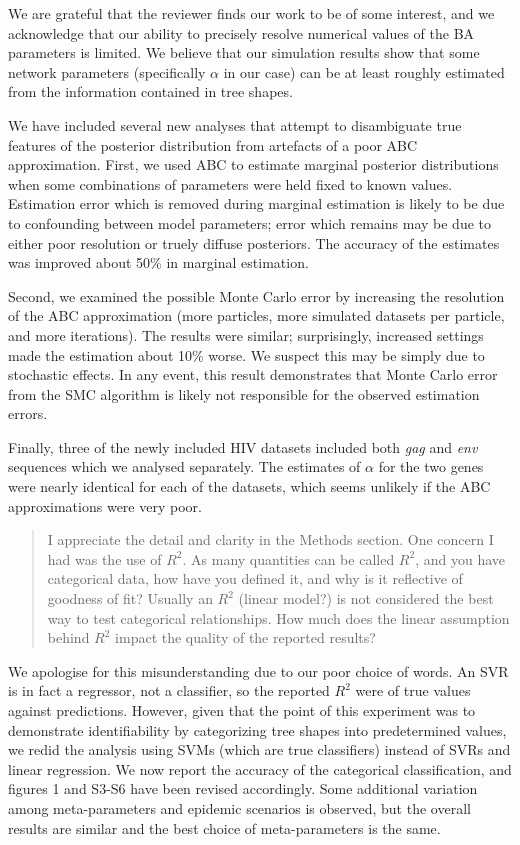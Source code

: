 \documentclass[12pt]{letter}
\begin{document}
\begin{letter}{ }
We are grateful that the reviewer finds our work to be of some interest, and we
acknowledge that our ability to precisely resolve numerical values of the BA
parameters is limited. We believe that our simulation results show that some
network parameters (specifically $\alpha$ in our case) can be at least roughly
estimated from the information contained in tree shapes.

We have included several new analyses that attempt to disambiguate true
features of the posterior distribution from artefacts of a poor ABC
approximation. First, we used ABC to estimate marginal posterior distributions
when some combinations of parameters were held fixed to known values.
Estimation error which is removed during marginal estimation is likely to be
due to confounding between model parameters; error which remains may be due to
either poor resolution or truely diffuse posteriors. The accuracy of the
estimates was improved about 50\% in marginal estimation.

Second, we examined the possible Monte Carlo error by increasing the resolution
of the ABC approximation (more particles, more simulated datasets per particle,
and more iterations). The results were similar; surprisingly, increased
settings made the estimation about 10\% worse. We suspect this may be simply
due to stochastic effects. In any event, this result demonstrates that Monte
Carlo error from the SMC algorithm is likely not responsible for the observed
estimation errors.

Finally, three of the newly included HIV datasets included both \textit{gag}
and \textit{env} sequences which we analysed separately. The estimates of
$\alpha$ for the two genes were nearly identical for each of the datasets,
which seems unlikely if the ABC approximations were very poor.

\begin{quote}
  \itshape

  I appreciate the detail and clarity in the Methods section. One concern I had
  was the use of $R^2$. As many quantities can be called $R^2$, and you have
  categorical data, how have you defined it, and why is it reflective of
  goodness of fit? Usually an $R^2$ (linear model?) is not considered the best
  way to test categorical relationships. How much does the linear assumption
  behind $R^2$ impact the quality of the reported results?
\end{quote}

We apologise for this misunderstanding due to our poor choice of words. An SVR
is in fact a regressor, not a classifier, so the reported $R^2$ were of true
values against predictions. However, given that the point of this experiment
was to demonstrate identifiability by categorizing tree shapes into
predetermined values, we redid the analysis using SVMs (which are true
classifiers) instead of SVRs and linear regression. We now report the accuracy
of the categorical classification, and figures 1 and S3-S6 have been revised
accordingly. Some additional variation among meta-parameters and epidemic
scenarios is observed, but the overall results are similar and the best choice
of meta-parameters is the same.


\end{letter}
\end{document}

